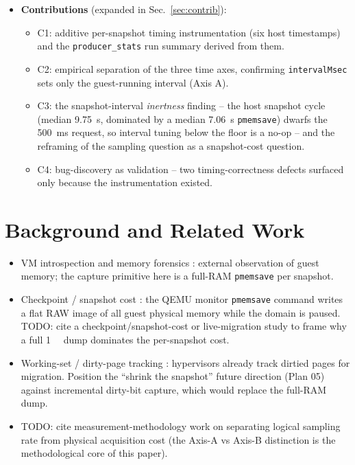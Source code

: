\documentclass[conference]{IEEEtran}
\begin{document}
\begin{itemize}
  \item \textbf{Contributions} (expanded in Sec.~\ref{sec:contrib}):
    \begin{itemize}
      \item C1: additive per-snapshot timing instrumentation
            (six host timestamps) and the \texttt{producer\_stats} run
            summary derived from them.
      \item C2: empirical separation of the three time axes, confirming
            \texttt{intervalMsec} sets only the guest-running interval
            (Axis A).
      \item C3: the snapshot-interval \emph{inertness} finding -- the host
            snapshot cycle (median \SI{9.75}{\second}, dominated by a median
            \SI{7.06}{\second} \texttt{pmemsave}) dwarfs the
            \SI{500}{\milli\second} request, so interval tuning below the
            floor is a no-op -- and the reframing of the sampling question as
            a snapshot-cost question.
      \item C4: bug-discovery as validation -- two timing-correctness defects
            surfaced only because the instrumentation existed.
    \end{itemize}
\end{itemize}

\section{Background and Related Work}
\begin{itemize}
  \item VM introspection and memory forensics \cite{garfinkel2003vmi}:
        external observation of guest memory; the capture primitive here is a
        full-RAM \texttt{pmemsave} per snapshot.
  \item Checkpoint / snapshot cost \cite{TODO_libvirt_pmemsave}: the QEMU
        monitor \texttt{pmemsave} command writes a flat RAW image of all guest
        physical memory while the domain is paused. TODO: cite a
        checkpoint/snapshot-cost or live-migration study to frame why a full
        \SI{1}{\gibi\byte} dump dominates the per-snapshot cost.
  \item Working-set / dirty-page tracking \cite{TODO_working_set_estimation}:
        hypervisors already track dirtied pages for migration. Position the
        ``shrink the snapshot'' future direction (Plan 05) against
        incremental dirty-bit capture, which would replace the full-RAM dump.
  \item TODO: cite measurement-methodology work on separating logical sampling
        rate from physical acquisition cost (the Axis-A vs Axis-B distinction
        is the methodological core of this paper).
\end{itemize}
\end{document}
